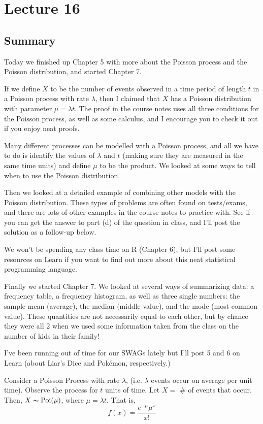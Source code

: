 \section{Lecture 16}
\subsection{Summary}
Today we finished up Chapter 5 with more about the Poisson process and the Poisson distribution, and started Chapter 7.

If we define $X$ to be the number of events observed in a time period of length $t$ in a Poisson process with rate $\lambda$, then I claimed that $X$ has a Poisson distribution with parameter $\mu = \lambda t$. The proof in the course notes uses all three conditions for the Poisson process, as well as some calculus, and I encourage you to check it out if you enjoy neat proofs.

Many different processes can be modelled with a Poisson process, and all we have to do is identify the values of $\lambda$ and $t$ (making sure they are measured in the same time units) and define $\mu$ to be the product. We looked at some ways to tell when to use the Poisson distribution.

Then we looked at a detailed example of combining other models with the Poisson distribution. These types of problems are often found on tests/exams, and there are lots of other examples in the course notes to practice with. See if you can get the answer to part (d) of the question in class, and I'll post the solution as a follow-up below.

We won't be spending any class time on R (Chapter 6), but I'll post some resources on Learn if you want to find out more about this neat statistical programming language.

Finally we started Chapter 7. We looked at several ways of summarizing data: a frequency table, a frequency histogram, as well as three single numbers: the sample mean (average), the median (middle value), and the mode (most common value). These quantities are not necessarily equal to each other, but by chance they were all 2 when we used some information taken from the class on the number of kids in their family!

I've been running out of time for our SWAGs lately but I'll post 5 and 6 on Learn (about Liar's Dice and Pokémon, respectively.)

Consider a Poisson Process with rate $ \lambda $, (i.e. $ \lambda $ events
occur on average per unit time). Observe the process for $ t $ units of time.
Let $ X= $ \# of events that occur. Then, $ X \thicksim \operatorname{Poi}(\mu) $, where
$ \mu=\lambda t $. That is,
\[ f(x)=\frac{e^{-\mu}\mu^x}{x!} \]

